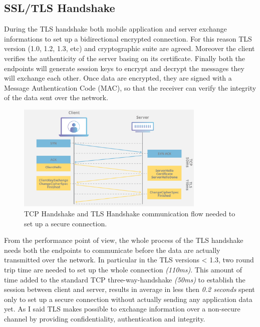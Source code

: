 		\subsection{SSL/TLS Handshake}
			\par During the TLS handshake both mobile application and server exchange informations to set up a bidirectional encrypted connection. For this reason TLS version (1.0, 1.2, 1.3, etc) and cryptographic suite are agreed. Moreover the client verifies the authenticity of the server basing on its certificate. Finally both the endpoints will generate session keys to encrypt and decrypt the messages they will exchange each other. Once data are encrypted, they are signed with a Message Authentication Code (MAC), so that the receiver can verify the integrity of the data sent over the network.
			\begin{figure}[ht]
				\centering
				\includegraphics[width=0.8\textwidth]{images/tcp-tls-handshake.png}
				\caption{TCP Handshake and TLS Handshake communication flow needed to set up a secure connection. \cite{image_tcp_tls_handshake}}
				\label{fig:tcp_tls_handshake}
			\end{figure}
			\par From the performance point of view, the whole process of the TLS handshake needs both the endpoints to communicate before the data are actually transmitted over the network. In particular in the TLS versions < 1.3, two round trip time are needed to set up the whole connection \textit{(110ms)}. This amount of time added to the standard TCP three-way-handshake \textit{(50ms)} to establish the session between client and server, results in average in less then \textit{0.2 seconds} spent only to set up a secure connection without actually sending any application data yet. 
			\newline
 			As I said TLS makes possible to exchange information over a non-secure channel by providing confidentiality, authentication and integrity.  
			
